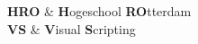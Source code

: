 \documentclass[a4paper, 11pt, oneside]{Thesis}  %
\begin{document}
\clearpage  %








\pagestyle{fancy}  %


\tableofcontents  %



\clearpage  %
{
\textbf{HRO} & \textbf{H}ogeschool \textbf{RO}tterdam \\
\textbf{VS} & \textbf{V}isual \textbf{S}cripting \\
}
\end{document}
